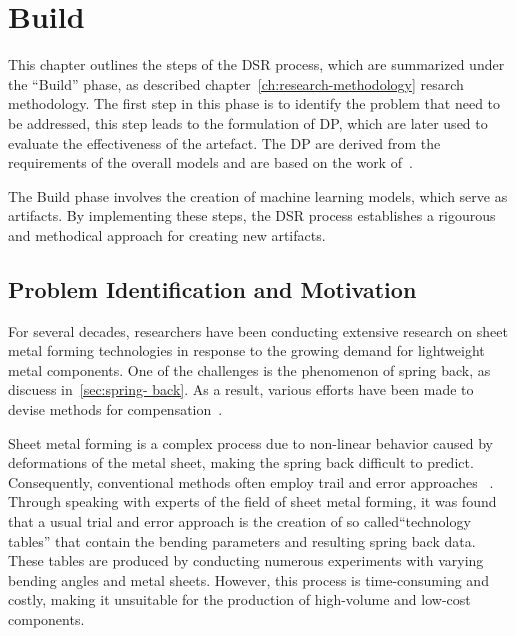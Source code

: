 
\chapter{Build}\label{ch:build}
This chapter outlines the steps of the \ac{DSR} process, which are
summarized under the ``Build'' phase, as described chapter~\ref{ch:research-methodology}
resarch methodology.
The first step in this phase is to identify the problem that need to be addressed,
this step leads to the formulation of \ac{DP}, which are later used to evaluate
the effectiveness of the artefact.
The \ac{DP} are derived from the requirements of the overall models and are based on
the work of~\cite{siebert2022construction}.

The Build phase involves the creation of machine learning models, which serve as
artifacts.
By implementing these steps, the DSR process establishes a rigourous and methodical
approach for creating new artifacts.


\section{Problem Identification and Motivation}\label{sec:problem-identification-and-
motivation}

For several decades, researchers have been conducting extensive research on sheet metal
forming technologies in response to the growing demand for lightweight metal components.
One of the challenges is the phenomenon of spring back, as discuess in~\ref{sec:spring-
back}.
As a result, various efforts have been made to devise methods for compensation~\cite[p.1]{
    liu_newmachinelearning_2012}.

Sheet metal forming is a complex process due to non-linear behavior caused by
deformations of the metal sheet, making the spring back difficult to predict.
Consequently, conventional methods often employ trail and error approaches~
\cite[p. 1]{dib_singleensembleclassifiers_2020}.
Through speaking with experts of the field of sheet metal forming, it was found that
a usual trial and error approach is the creation of so called``technology tables'' that
contain the bending parameters and resulting spring back data.
These tables are produced by conducting numerous experiments with varying bending
angles and metal sheets.
However, this process is time-consuming and costly, making it
unsuitable for the production of high-volume and low-cost components.


